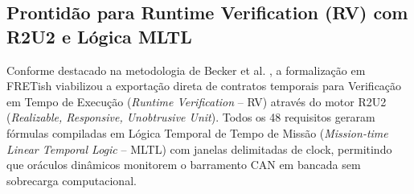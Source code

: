 \subsection{Prontidão para Runtime Verification (RV) com R2U2 e Lógica MLTL}
Conforme destacado na metodologia de Becker et al. \cite{sheridan2025}, a formalização em FRETish viabilizou a exportação direta de contratos temporais para Verificação em Tempo de Execução (\textit{Runtime Verification} -- RV) através do motor R2U2 (\textit{Realizable, Responsive, Unobtrusive Unit}). Todos os 48 requisitos geraram fórmulas compiladas em Lógica Temporal de Tempo de Missão (\textit{Mission-time Linear Temporal Logic} -- MLTL) com janelas delimitadas de clock, permitindo que oráculos dinâmicos monitorem o barramento CAN em bancada sem sobrecarga computacional.

